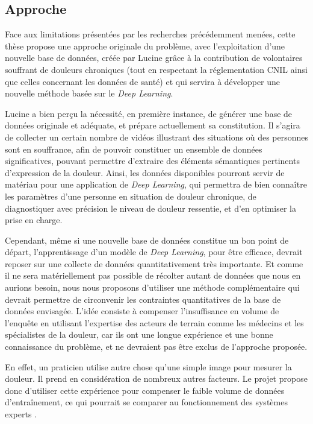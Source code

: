 \documentclass[french]{article}
\begin{document}
\subsection{Approche}
\label{sec:orgcad02fb}

Face aux limitations présentées par les recherches précédemment menées, cette
thèse propose une approche originale du problème, avec l'exploitation
d’une nouvelle base de données, créée par Lucine grâce à la contribution de volontaires
souffrant de douleurs chroniques (tout en respectant la réglementation CNIL
ainsi que celles concernant les données de santé) et qui servira à
développer une nouvelle méthode basée sur le \emph{Deep Learning}.  

Lucine a bien perçu la nécessité, en première instance, de générer une base de
données originale et adéquate, et prépare actuellement sa constitution. Il
s’agira de collecter un certain nombre de vidéos illustrant des situations où
des personnes sont en souffrance, afin de pouvoir constituer un ensemble de
données significatives, pouvant permettre d’extraire des éléments sémantiques
pertinents d’expression de la douleur. Ainsi, les données disponibles pourront
servir de matériau pour une application de \emph{Deep Learning}, qui permettra de bien
connaître les paramètres d’une personne en situation de douleur chronique, de
diagnostiquer avec précision le niveau de douleur ressentie, et d’en optimiser
la prise en charge.

Cependant, même si une nouvelle base de données constitue un bon point de
départ, l’apprentissage d’un modèle de \emph{Deep Learning}, pour être efficace,
devrait reposer sur une collecte de données quantitativement très importante. Et
comme il ne sera matériellement pas possible de récolter autant de données que
nous en aurions besoin, nous nous proposons d’utiliser une méthode
complémentaire qui devrait permettre de circonvenir les contraintes
quantitatives de la base de données envisagée. L’idée consiste à compenser
l’insuffisance en volume de l’enquête en utilisant l’expertise des acteurs de
terrain comme les médecins et les spécialistes de la douleur, car ils ont une
longue expérience et une bonne connaissance du problème, et ne devraient pas
être exclus de l’approche proposée.  

En effet, un praticien utilise autre chose qu’une simple image pour mesurer la
douleur. Il prend en considération de nombreux autres facteurs. Le projet
propose donc d’utiliser cette expérience pour compenser le faible volume de
données d’entraînement, ce qui pourrait se comparer au fonctionnement des
systèmes experts \cite{giarratano1998expert}.  
\end{document}
